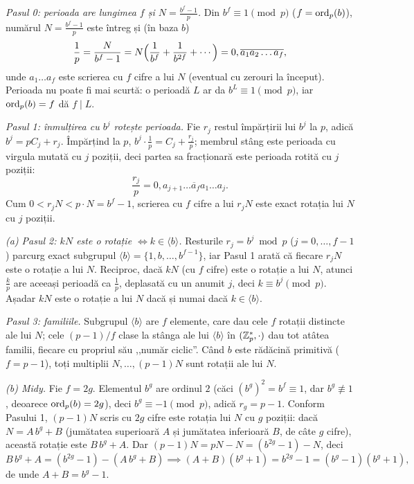 \begin{solutie}
\textit{Pasul 0: perioada are lungimea $f$ și $N = \frac{b^f-1}{p}$.}
Din $b^f \equiv 1 \pmod p$ ($f = \operatorname{ord}_p(b)$), numărul $N = \frac{b^f-1}{p}$ este
întreg și (în baza $b$)
\[
  \frac{1}{p} = \frac{N}{b^f-1}
  = N\Bigl(\frac{1}{b^f} + \frac{1}{b^{2f}} + \cdots\Bigr)
  = 0,\overline{a_1 a_2 \dots a_f},
\]
unde $a_1 \dots a_f$ este scrierea cu $f$ cifre a lui $N$ (eventual cu
zerouri la început). Perioada nu poate fi mai scurtă: o perioadă $L$ ar da
$b^L \equiv 1 \pmod p$, iar $\operatorname{ord}_p(b) = f$ dă $f \mid L$.

\smallskip
\textit{Pasul 1: înmulțirea cu $b^j$ rotește perioada.} Fie $r_j$
restul împărțirii lui $b^j$ la $p$, adică $b^j = pC_j + r_j$. Împărțind la $p$,
$b^j \cdot \frac{1}{p} = C_j + \frac{r_j}{p}$; membrul stâng este perioada
cu virgula mutată cu $j$ poziții, deci partea sa fracționară este
perioada rotită cu $j$ poziții:
\[
  \frac{r_j}{p} = 0,\overline{a_{j+1} \dots a_f a_1 \dots a_j}.
\]
Cum $0 < r_j N < p \cdot N = b^f - 1$, scrierea cu $f$ cifre a lui $r_j N$ este
exact rotația lui $N$ cu $j$ poziții.

\smallskip
\textit{(a) Pasul 2: $kN$ este o rotație $\iff k \in \langle b \rangle$.}
Resturile $r_j = b^j \bmod p$ ($j = 0, \dots, f-1$) parcurg exact
subgrupul $\langle b \rangle = \{1, b, \dots, b^{f-1}\}$, iar Pasul 1 arată că
fiecare $r_j N$ este o rotație a lui $N$. Reciproc, dacă $kN$ (cu $f$ cifre)
este o rotație a lui $N$, atunci $\frac{k}{p}$ are aceeași perioadă ca $\frac{1}{p}$,
deplasată cu un anumit $j$, deci $k \equiv b^j \pmod p$. Așadar $kN$ este o rotație
a lui $N$ dacă și numai dacă $k \in \langle b \rangle$.

\smallskip
\textit{Pasul 3: familiile.} Subgrupul $\langle b \rangle$ are $f$ elemente, care dau cele $f$
rotații distincte ale lui $N$; cele $(p-1)/f$ clase la stânga ale lui $\langle b \rangle$
în $(\mathbb{Z}_p^*, \cdot)$ dau tot atâtea familii, fiecare cu propriul său
,,număr ciclic''. Când $b$ este rădăcină primitivă ($f = p-1$), toți
multiplii $N, \dots, (p-1)N$ sunt rotații ale lui $N$.

\smallskip
\textit{(b) Midy.} Fie $f = 2g$. Elementul $b^g$ are ordinul $2$ (căci
$(b^g)^2 = b^f \equiv 1$, dar $b^g \not\equiv 1$, deoarece $\operatorname{ord}_p(b) = 2g$), deci
$b^g \equiv -1 \pmod p$, adică $r_g = p - 1$. Conform Pasului 1, $(p-1)N$ scris cu $2g$
cifre este rotația lui $N$ cu $g$ poziții: dacă $N = A\,b^g + B$ (jumătatea superioară $A$ și
jumătatea inferioară $B$, de câte $g$ cifre), această rotație este $B\,b^g + A$. Dar
$(p-1)N = pN - N = (b^{2g} - 1) - N$, deci
\[
  B\,b^g + A = (b^{2g}-1) - (A\,b^g + B)
  \implies (A+B)(b^g+1) = b^{2g} - 1 = (b^g-1)(b^g+1),
\]
de unde $A + B = b^g - 1$.


\end{solutie}
